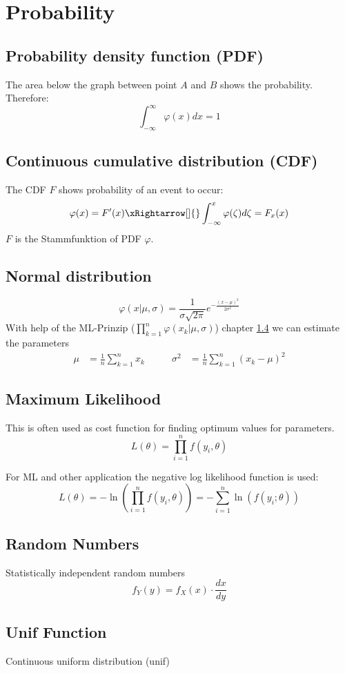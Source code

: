 \section{Probability}
\subsection{Probability density function (PDF)}
The area below the graph between point $A$ and $B$ shows the probability. Therefore:
\[
\int_{-\infty}^{\infty}\varphi(x)dx = 1
\]

\subsection{Continuous cumulative distribution (CDF)}
The CDF $F$ shows probability of an event to occur:
\[
\varphi(x) = F'(x) \xRightarrow[]{} \int_{-\infty}^{x}\varphi(\zeta)d\zeta = F_x(x)
\]
$F$ is the Stammfunktion of PDF $\varphi$.


\subsection{Normal distribution}
\[
\varphi(x|\mu, \sigma) = \frac{1}{\sigma\sqrt{2\pi}}e^{-\frac{(x-\mu)^2}{2\sigma^2}}
\]
With help of the ML-Prinzip ($\prod_{k = 1}^{n}\varphi(x_k|\mu, \sigma)$) chapter \ref{ml} we can estimate the parameters
\begin{align*}
	\mu &= \frac{1}{n}\sum_{k=1}^{n}x_k &\qquad 	\sigma^2 &= \frac{1}{n}\sum_{k=1}^{n}(x_k - \mu)^2
\end{align*}

\subsection{Maximum Likelihood}\label{ml}
This is often used as cost function for finding optimum values for parameters.
\[
L(\theta) = \prod_{i = 1}^{n}f(y_i, \theta)
\]

For ML and other application the negative log likelihood function is used:
\[
L(\theta) = -\ln\left( \prod_{i = 1}^{n}f(y_i, \theta)\right) = -\sum_{i=1}^{n}\ln(f(y_i; \theta))
\]

\subsection{Random Numbers}
Statistically independent random numbers
\[
f_Y(y) =f_X(x) \cdot \frac{dx}{dy}
\]

\subsection{Unif Function}
Continuous uniform distribution (unif)

